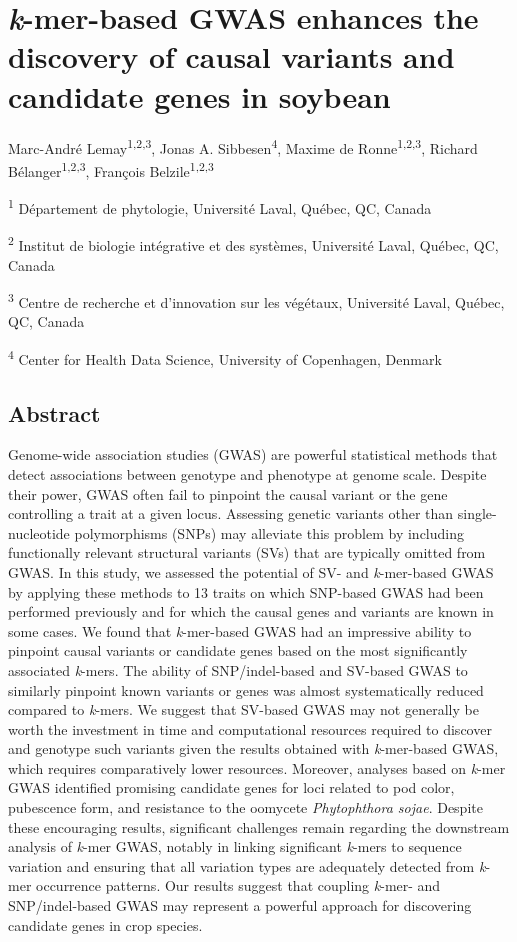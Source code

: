 \chapter*{\textit{k}-mer-based GWAS enhances the discovery of causal variants and candidate genes in soybean}
\label{kmer-gwas}

Marc-André Lemay\textsuperscript{1,2,3},
Jonas A. Sibbesen\textsuperscript{4},
Maxime de Ronne\textsuperscript{1,2,3},
Richard Bélanger\textsuperscript{1,2,3},
François Belzile\textsuperscript{1,2,3}

\textsuperscript{1} Département de phytologie, Université Laval, Québec, QC, Canada

\textsuperscript{2} Institut de biologie intégrative et des systèmes, Université Laval, Québec, QC, Canada

\textsuperscript{3} Centre de recherche et d’innovation sur les végétaux, Université Laval, Québec, QC, Canada

\textsuperscript{4} Center for Health Data Science, University of Copenhagen, Denmark

\clearpage

\section*{Abstract}

Genome-wide association studies (GWAS) are powerful statistical methods
that detect associations between genotype and phenotype at genome scale. Despite
their power, GWAS often fail to pinpoint the causal variant or the gene
controlling a trait at a given locus.  Assessing genetic variants other
than single-nucleotide polymorphisms (SNPs) may alleviate this problem
by including functionally relevant structural variants (SVs) that are
typically omitted from GWAS.  In this study, we assessed the potential
of SV- and \emph{k}-mer-based GWAS by applying these methods to 13
traits on which SNP-based GWAS had been performed previously and for
which the causal genes and variants are known in some cases. We found
that \emph{k}-mer-based GWAS had an impressive ability to pinpoint
causal variants or candidate genes based on the most significantly
associated \emph{k}-mers. The ability of SNP/indel-based and SV-based
GWAS to similarly pinpoint known variants or genes was almost
systematically reduced compared to \emph{k}-mers.  We suggest that
SV-based GWAS may not generally be worth the investment in time and
computational resources required to discover and genotype such variants
given the results obtained with \emph{k}-mer-based GWAS, which requires
comparatively lower resources.  Moreover, analyses based on
\emph{k}-mer GWAS identified promising candidate genes for loci related
to pod color, pubescence form, and resistance to the oomycete
\textit{Phytophthora sojae}.  Despite these encouraging results,
significant challenges remain regarding the downstream analysis of
\emph{k}-mer GWAS, notably in linking significant \emph{k}-mers to
sequence variation and ensuring that all variation types are adequately
detected from \emph{k}-mer occurrence patterns.  Our results suggest
that coupling \emph{k}-mer- and SNP/indel-based GWAS may represent a
powerful approach for discovering candidate genes in crop species.

